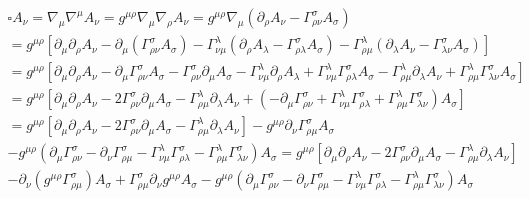\documentclass[12pt]{article}
\def\nn{\nonumber}
\begin{document}
\begin{gather}
\square
A_{\nu}
=
\nabla_{\mu}
\nabla^{\mu}
A_{\nu}
=
g^{\mu \rho}
\nabla_{\mu}
\nabla_{\rho}
A_{\nu}
=
g^{\mu \rho}
\nabla_{\mu}
\left(
\partial_{\rho}
A_{\nu}
-
\Gamma^{\sigma}_{\rho\nu}
A_{\sigma}
\right)
\nn \\
=
g^{\mu \rho}
\left[
\partial_{\mu}
\partial_{\rho}
A_{\nu}
-
\partial_{\mu}
\left(
\Gamma^{\sigma}_{\rho\nu}
A_{\sigma}
\right)
-
\Gamma^{\lambda}_{\nu \mu}
\left(
\partial_{\rho}
A_{\lambda}
-
\Gamma^{\sigma}_{\rho\lambda}
A_{\sigma}
\right)
-
\Gamma^{\lambda}_{\rho \mu}
\left(
\partial_{\lambda}
A_{\nu}
-
\Gamma^{\sigma}_{\lambda\nu}
A_{\sigma}
\right)
\right]
\nn \\
=
g^{\mu \rho}
\left[
\partial_{\mu}
\partial_{\rho}
A_{\nu}
-
\partial_{\mu}
\Gamma^{\sigma}_{\rho\nu}
A_{\sigma}
-
\Gamma^{\sigma}_{\rho\nu}
\partial_{\mu}
A_{\sigma}
-
\Gamma^{\lambda}_{\nu \mu}
\partial_{\rho}
A_{\lambda}
+
\Gamma^{\lambda}_{\nu \mu}
\Gamma^{\sigma}_{\rho\lambda}
A_{\sigma}
-
\Gamma^{\lambda}_{\rho \mu}
\partial_{\lambda}
A_{\nu}
+
\Gamma^{\lambda}_{\rho \mu}
\Gamma^{\sigma}_{\lambda\nu}
A_{\sigma}
\right]
\nn \\
=
g^{\mu \rho}
\left[
\partial_{\mu}
\partial_{\rho}
A_{\nu}
-
2 \Gamma^{\sigma}_{\rho\nu}
\partial_{\mu}
A_{\sigma}
-
\Gamma^{\lambda}_{\rho \mu}
\partial_{\lambda}
A_{\nu}
+
\left(
-
\partial_{\mu}
\Gamma^{\sigma}_{\rho\nu}
+
\Gamma^{\lambda}_{\nu \mu}
\Gamma^{\sigma}_{\rho\lambda}
+
\Gamma^{\lambda}_{\rho \mu}
\Gamma^{\sigma}_{\lambda\nu}
\right)
A_{\sigma}
\right]
\nn \\
=
g^{\mu \rho}
\left[
\partial_{\mu}
\partial_{\rho}
A_{\nu}
-
2 \Gamma^{\sigma}_{\rho\nu}
\partial_{\mu}
A_{\sigma}
-
\Gamma^{\lambda}_{\rho \mu}
\partial_{\lambda}
A_{\nu}
\right]
-
g^{\mu \rho}
\partial_{\nu}
\Gamma^{\sigma}_{\rho\mu}
A_{\sigma}
\nn \\
-
g^{\mu \rho}
\left(
\partial_{\mu}
\Gamma^{\sigma}_{\rho\nu}
-
\partial_{\nu}
\Gamma^{\sigma}_{\rho\mu}
-
\Gamma^{\lambda}_{\nu \mu}
\Gamma^{\sigma}_{\rho\lambda}
-
\Gamma^{\lambda}_{\rho \mu}
\Gamma^{\sigma}_{\lambda\nu}
\right)
A_{\sigma}
=
g^{\mu \rho}
\left[
\partial_{\mu}
\partial_{\rho}
A_{\nu}
-
2 \Gamma^{\sigma}_{\rho\nu}
\partial_{\mu}
A_{\sigma}
-
\Gamma^{\lambda}_{\rho \mu}
\partial_{\lambda}
A_{\nu}
\right]
\nn \\
-
\partial_{\nu}
(g^{\mu \rho}
\Gamma^{\sigma}_{\rho\mu})
A_{\sigma}
+
\Gamma^{\sigma}_{\rho\mu}
\partial_{\nu}
g^{\mu \rho}
A_{\sigma}
-
g^{\mu \rho}
\left(
\partial_{\mu}
\Gamma^{\sigma}_{\rho\nu}
-
\partial_{\nu}
\Gamma^{\sigma}_{\rho\mu}
-
\Gamma^{\lambda}_{\nu \mu}
\Gamma^{\sigma}_{\rho\lambda}
-
\Gamma^{\lambda}_{\rho \mu}
\Gamma^{\sigma}_{\lambda\nu}
\right)
A_{\sigma}
\end{gather}
\end{document}
